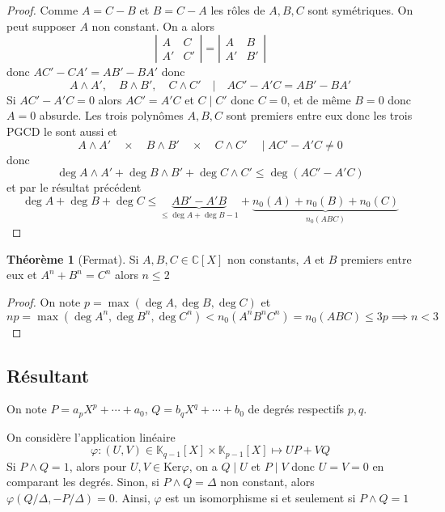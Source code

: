 \documentclass{article}
\theoremstyle{definition}
\newtheorem*{thm}{Théorème}
\begin{document}
\begin{proof}
Comme $A=C-B$ et $B=C-A$ les rôles de $A, B, C$ sont symétriques. On peut supposer $A$ non constant. On a alors \[
    \left|\begin{matrix}A&C\\A'&C'\end{matrix}\right|=\left|\begin{matrix}A&B\\A'&B'\end{matrix}\right|
\]
donc $AC'-CA'=AB'-BA'$ donc \[
    A\land A', \quad B\land B', \quad C\land C'\quad\Big|\quad AC'-A'C=AB'-BA'
\]
Si $AC'-A'C=0$ alors $AC'=A'C$ et $C\;|\;C'$ donc $C=0$, et de même $B=0$ donc $A=0$ absurde. Les trois polynômes $A, B, C$ sont premiers entre eux donc les trois PGCD le sont aussi et \[
    A\land A' \quad \times \quad B\land B'\quad \times \quad C\land C'\quad \;\Big|\; AC'-A'C\neq 0
\]
donc \[
    \deg A\land A' + \deg B\land B'+\deg C\land C'\leq \deg(AC'-A'C)
\]
et par le résultat précédent \[
    \deg A+\deg B+\deg C \leq \underbrace{AB'-A'B}_{\leq \deg A+\deg B-1}+ \underbrace{n_0(A)+n_0(B)+n_0(C)}_{n_0(ABC)}
\]
\end{proof}

\begin{thm}[Fermat]
    Si $A, B, C\in\mathbb C[X]$ non constants, $A$ et $B$ premiers entre eux et $A^n+B^n=C^n$ alors $n\leq 2$
\end{thm}

\begin{proof}
On note $p=\max (\deg A, \deg B, \deg C)$ et \[
    np=\max(\deg A^n, \deg B^n, \deg C^n)< n_0(A^nB^nC^n)=n_0(ABC)\leq 3p \implies n<3
\]
\end{proof}

\subsection{Résultant}

On note $P=a_pX^p+\cdots + a_0$, $Q=b_qX^q+\cdots + b_0$ de degrés respectifs $p, q$.

On considère l'application linéaire \[
    \varphi: (U, V)\in\mathbb K_{q-1}[X]\times \mathbb K_{p-1}[X]\longmapsto UP+VQ
\]
Si $P\land Q=1$, alors pour $U, V\in\mathrm{Ker}\varphi$, on a $Q\;|\;U$ et $P\;|\;V$ donc $U=V=0$ en comparant les degrés. Sinon, si $P\land Q=\Delta$ non constant, alors $\varphi(Q/\Delta, -P/\Delta)=0$. Ainsi, $\varphi$ est un isomorphisme si et seulement si $P\land Q=1$
\end{document}
